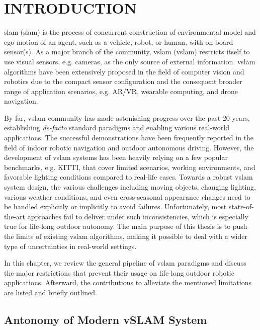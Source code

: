 \chapter{INTRODUCTION}
\acrlong{slam} (\acrshort{slam}) is the process of concurrent construction of environmental model and ego-motion of an agent, such as a vehicle, robot, or human, with on-board sensor(s). 
As a major branch of the community, \acrlong{vslam} (\acrshort{vslam}) restricts itself to use visual sensors, e.g. cameras, as the only source of external information. 
\acrshort{vslam} algorithms have been extensively proposed in the field of computer vision and robotics due to the compact sensor configuration and the consequent broader range of application scenarios, e.g. AR/VR, wearable computing, and drone navigation. 

By far, \acrshort{vslam} community has made astonishing progress over the past 20 years, establishing {\em de-facto} standard paradigms and enabling various real-world applications.
The successful demonstrations have been frequently reported in the field of indoor robotic navigation and outdoor autonomous driving.
However, the development of \acrshort{vslam} systems has been heavily relying on a few popular benchmarks, e.g. KITTI, that cover limited scenarios, working environments, and favorable lighting conditions compared to real-life cases. 
Towards a robust \acrshort{vslam} system design, the various challenges including moving objects, changing lighting, various weather conditions, and even cross-seasonal appearance changes need to be handled explicitly or implicitly to avoid failures. 
Unfortunately, most state-of-the-art approaches fail to deliver under such inconsistencies, which is especially true for life-long outdoor autonomy. 
The main purpose of this thesis is to push the limits of existing \acrshort{vslam} algorithms, making it possible to deal with a wider type of uncertainties in real-world settings. 

In this chapter, we review the general pipeline of \acrshort{vslam} paradigms and discuss the major restrictions that prevent their usage on life-long outdoor robotic applications. Afterward, the contributions to alleviate the mentioned limitations are listed and briefly outlined. 

\section{Antonomy of Modern vSLAM System}
\label{sec:intro_slampipeline}

